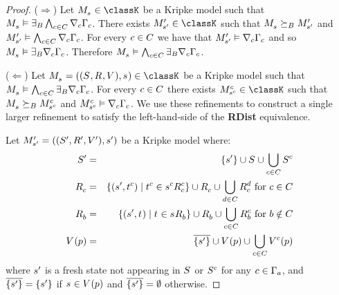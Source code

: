 \begin{proof}
($\Rightarrow$) Let $\kPModel{\kStateS} \in \classK$ be a Kripke model such that $\kPModel{\kStateS} \entails \somerefsBs \bigwedge_{\agentC \in \agentsC} \coversC \Gamma_\agentC$.
There exists $\kPModelP{\kStateSP} \in \classK$ such that $\kPModel{\kStateS} \simulatesBs \kPModelP{\kStateSP}$ and $\kPModelP{\kStateSP} \entails \bigwedge_{\agentC \in \agentsC} \coversC \Gamma_\agentC$.
For every $\agentC \in \agentsC$ we have that $\kPModelP{\kStateSP} \entails \coversC \Gamma_\agentC$ and so $\kPModel{\kStateS} \entails \somerefsBs \coversC \Gamma_\agentC$.
Therefore $\kPModel{\kStateS} \entails \bigwedge_{\agentC \in \agentsC} \somerefsBs \coversC \Gamma_\agentC$.

($\Leftarrow$) Let $\kPModelAndTuple{\kStateS} \in \classK$ be a Kripke model such that $\kPModel{\kStateS} \entails \bigwedge_{\agentC \in \agentsC} \somerefsBs \coversC \Gamma_\agentC$.
For every $\agentC \in \agentsC$ there exists $\kPModel[\agentC]{\kStateS[\agentC]} \in \classK$ such that $\kPModel{\kStateS} \simulatesBs \kPModel[\agentC]{\kStateS[\agentC]}$ and $\kPModel[\agentC]{\kStateS[\agentC]} \entails \coversC \Gamma_\agentC$.
We use these refinements to construct a single larger refinement to satisfy the left-hand-side of the {\bf RDist} equivalence.

Let $\kPModelAndTupleP{\kStateSP}$ be a Kripke model where:
\begin{eqnarray*}
    \kStatesP &=& \{\kStateSP\} \cup \kStates \cup \bigcup_{\agentC \in \agentsC} \kStates[\agentC]\\
    \kAccessibilityC &=& \{(\kStateSP, \kStateT[\agentC]) \mid \kStateT[\agentC] \in \kSuccessorsC[\agentC]{\kStateS[\agentC]}\} \cup \kAccessibilityC \cup \bigcup_{\agentD \in \agentsC} \kAccessibilityC[\agentD] \text{ for } \agentC \in \agentsC\\
    \kAccessibilityB &=& \{(\kStateSP, \kStateT) \mid \kStateT \in \kSuccessorsB{\kStateS}\} \cup \kAccessibilityB \cup \bigcup_{\agentC \in \agentsC} \kAccessibilityB[\agentC] \text{ for } \agentB \notin \agentsC\\
    \kValuation(\atomP) &=& \overline{\{\kStateSP\}} \cup \kValuation(\atomP) \cup \bigcup_{\agentC \in \agentsC} \kValuation[\agentC](\atomP)
\end{eqnarray*}
where $\kStateSP$ is a fresh state not appearing in $\kStates$ or $\kStates[\agentC]$ for any $\agentC \in \Gamma_\agentA$, and $\overline{\{\kStateSP\}} = \{\kStateSP\}$ if $\kStateS \in \kValuation(\atomP)$ and $\overline{\{\kStateSP\}} = \emptyset$ otherwise.


\end{proof}
